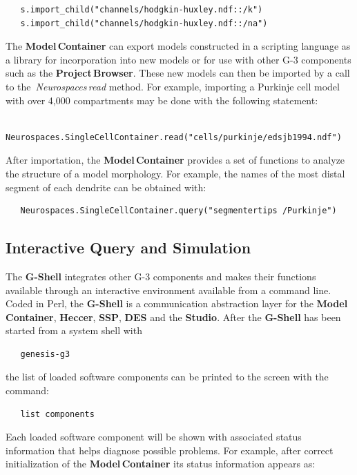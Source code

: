 \documentclass[10pt]{article}
\begin{document}
\begin{verbatim}
   s.import_child("channels/hodgkin-huxley.ndf::/k")
   s.import_child("channels/hodgkin-huxley.ndf::/na")
\end{verbatim}

The {\bf Model\,Container} can export models constructed in a
scripting language as a library for incorporation into new models or
for use with other G-3 components such as the {\bf Project\,Browser}.
These new models can then be imported by a call to the\,{\it
  Neurospaces}\,{\it read} method. For example, importing a Purkinje
cell model with over 4,000 compartments may be done with the following
statement:

\begin{verbatim}
   Neurospaces.SingleCellContainer.read("cells/purkinje/edsjb1994.ndf")
\end{verbatim}

After importation, the {\bf Model\,Container} provides a set of
functions to analyze the structure of a model morphology.  For
example, the names of the most distal segment of each dendrite can be
obtained with:

\begin{verbatim}
   Neurospaces.SingleCellContainer.query("segmentertips /Purkinje")
\end{verbatim}

\subsection*{Interactive Query and Simulation}

The {\bf G-Shell} integrates other
G-3 components and makes their functions available through an
interactive environment available from a command line.  Coded in Perl, the {\bf G-Shell} is a
communication abstraction layer for 
the {\bf Model\,Container}, {\bf Heccer}, {\bf SSP}, {\bf DES} and the {\bf
  Studio}.  After the {\bf G-Shell} has been started from a system
shell with
\begin{verbatim}
   genesis-g3
\end{verbatim}
the list of loaded software components can be printed to the screen with the command:

\begin{verbatim}
   list components
\end{verbatim}

Each loaded software component will be shown with associated status
information that helps diagnose possible problems.  For
example, after correct initialization of the {\bf Model\,Container} its
status information appears as:
\end{document}

